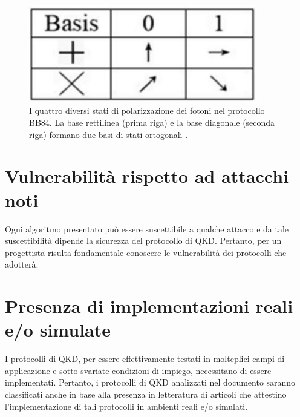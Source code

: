 \begin{figure}[h]
    \centering
    \includegraphics[width=10cm]{immagini/ortobasis.png}
    \caption{I quattro diversi stati di polarizzazione dei fotoni nel protocollo BB84. La base rettilinea (prima riga) e la base diagonale (seconda riga) formano due basi di stati ortogonali \cite{survey_qc_qkd}.}
    \label{fig:ortobasis}
\end{figure}

\section{Vulnerabilità rispetto ad attacchi noti}

Ogni algoritmo presentato può essere suscettibile a qualche attacco e da tale suscettibilità dipende la sicurezza del protocollo di QKD. Pertanto, per un progettista risulta fondamentale conoscere le vulnerabilità dei protocolli che adotterà.

\section{Presenza di implementazioni reali e/o simulate}

I protocolli di QKD, per essere effettivamente testati in molteplici campi di applicazione e sotto svariate condizioni di impiego, necessitano di essere implementati. Pertanto, i protocolli di QKD analizzati nel documento saranno classificati anche in base alla presenza in letteratura di articoli che attestino l'implementazione di tali protocolli in ambienti reali e/o simulati.